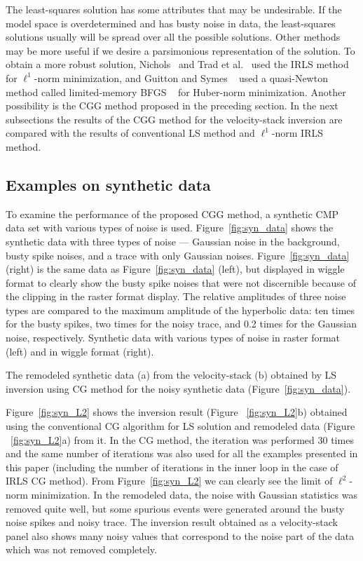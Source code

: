 The least-squares solution has some attributes that may be undesirable. 
If the model space is overdetermined and has busty noise in data,
the least-squares solutions usually will be spread over all the possible solutions. 
Other methods may be more useful 
if we desire a parsimonious representation of the solution. 
To obtain a more robust solution,
Nichols~ and Trad et al.~ 
used the IRLS method for $\ell^1$-norm minimization,
and Guitton and Symes ~ used 
a quasi-Newton method called limited-memory BFGS 
~\cite{Broyden-16-670,Fletcher-13-03170322,Goldfarb-24-023026,Shanno-24-06470657,Nocedal-95-03390353} 
for Huber-norm minimization.
Another possibility is the CGG method proposed in the preceding section.
In the next subsections the results of the CGG method 
for the velocity-stack inversion are 
compared with the results of conventional 
LS method and $\ell^1$-norm IRLS method.


\subsection{Examples on synthetic data}
To examine the performance of the proposed CGG method,
a synthetic CMP data set with various types of noise is used.
Figure~\ref{fig:syn_data} shows the synthetic data
with three types of noise 
--- Gaussian noise in the background, busty spike noises, 
and a trace with only Gaussian noises.
Figure~\ref{fig:syn_data} (right) is the same data as Figure~\ref{fig:syn_data} (left), 
but displayed in wiggle format to clearly show the busty spike noises
that were not discernible because of the clipping in the raster format display.
The relative amplitudes of three noise types are compared to the maximum amplitude of the hyperbolic data:
ten times for the busty spikes, two times for the noisy trace, 
and 0.2 times for the Gaussian noise, respectively.
{Synthetic data with various types of noise in raster format (left) and in wiggle format (right).}

{The remodeled synthetic data (a) from the velocity-stack (b) obtained by LS inversion 
using CG method for the noisy synthetic data (Figure~\ref{fig:syn_data}).}

Figure~\ref{fig:syn_L2} shows 
the inversion result (Figure ~\ref{fig:syn_L2}b) obtained using the conventional 
CG algorithm for LS solution and remodeled data (Figure ~\ref{fig:syn_L2}a) from it. 
In the CG method, the iteration was performed 30 times 
and the same number of iterations was also used for all the examples presented in this paper
(including the number of iterations in the inner loop in the case of IRLS CG method).
From Figure~\ref{fig:syn_L2} we can clearly see the limit of $\ell^2$-norm minimization.
In the remodeled data, the noise with Gaussian statistics was removed quite well,
but some spurious events were generated around the busty noise spikes and noisy trace.
The inversion result obtained as a velocity-stack panel 
also shows many noisy values that correspond to
the noise part of the data which was not removed completely.

